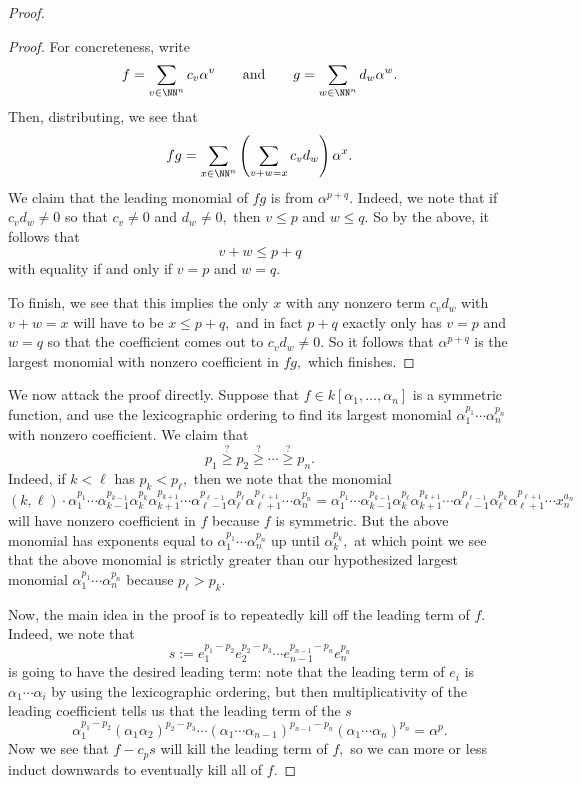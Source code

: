 \begin{proof}
\begin{proof}
		For concreteness, write
		\[f=\sum_{v\in \NN^n}c_v\alpha^v\qquad\text{and}\qquad g=\sum_{w\in\NN^n}d_w\alpha^w.\]
		Then, distributing, we see that
		\[fg=\sum_{x\in\NN^n}\left(\sum_{v+w=x}c_vd_w\right)\alpha^x.\]
		We claim that the leading monomial of $fg$ is from $\alpha^{p+q}.$ Indeed, we note that if $c_vd_w\ne0$ so that $c_v\ne0$ and $d_w\ne0,$ then $v\le p$ and $w\le q.$ So by the above, it follows that
		\[v+w\le p+q\]
		with equality if and only if $v=p$ and $w=q.$

		To finish, we see that this implies the only $x$ with any nonzero term $c_vd_w$ with $v+w=x$ will have to be $x\le p+q,$ and in fact $p+q$ exactly only has $v=p$ and $w=q$ so that the coefficient comes out to $c_vd_w\ne0.$ So it follows that $\alpha^{p+q}$ is the largest monomial with nonzero coefficient in $fg,$ which finishes.
	\end{proof}

	We now attack the proof directly. Suppose that $f\in k[\alpha_1,\ldots,\alpha_n]$ is a symmetric function, and use the lexicographic ordering to find its largest monomial $\alpha_1^{p_1}\cdots \alpha_n^{p_n}$ with nonzero coefficient. We claim that
	\[p_1\stackrel?\ge p_2\stackrel?\ge\cdots\stackrel?\ge p_n.\]
	Indeed, if $k<\ell$ has $p_k<p_\ell,$ then we note that the monomial
	\[(k,\ell)\cdot \alpha_1^{p_1}\cdots \alpha_{k-1}^{p_{k-1}}\alpha_k^{p_k}\alpha_{k+1}^{p_{k+1}}\cdots \alpha_{\ell-1}^{p_{\ell-1}}\alpha_\ell^{p_\ell}\alpha_{\ell+1}^{p_{\ell+1}} \cdots \alpha_n^{p_n}=\alpha_1^{p_1}\cdots \alpha_{k-1}^{p_{k-1}}\alpha_k^{p_\ell}\alpha_{k+1}^{p_{k+1}}\cdots \alpha_{\ell-1}^{p_{\ell-1}}\alpha_\ell^{p_k}\alpha_{\ell+1}^{p_{\ell+1}} \cdots x_n^{a_n}\]
	will have nonzero coefficient in $f$ because $f$ is symmetric. But the above monomial has exponents equal to $\alpha_1^{p_1}\cdots\alpha_n^{p_n}$ up until $\alpha_k^{p_k},$ at which point we see that the above monomial is strictly greater than our hypothesized largest monomial $\alpha_1^{p_1}\cdots \alpha_n^{p_n}$ because $p_\ell>p_k.$

	Now, the main idea in the proof is to repeatedly kill off the leading term of $f.$ Indeed, we note that
	\[s:=e_1^{p_1-p_2}e_2^{p_2-p_3}\cdots e_{n-1}^{p_{n-1}-p_n}e_n^{p_n}\]
	is going to have the desired leading term: note that the leading term of $e_i$ is $\alpha_1\cdots\alpha_i$ by using the lexicographic ordering, but then multiplicativity of the leading coefficient tells us that the leading term of the $s$
	\[\alpha_1^{p_1-p_2}(\alpha_1\alpha_2)^{p_2-p_3}\cdots(\alpha_1\cdots\alpha_{n-1})^{p_{n-1}-p_n}(\alpha_1\cdots\alpha_n)^{p_n}=\alpha^p.\]
	Now we see that $f-c_ps$ will kill the leading term of $f,$ so we can more or less induct downwards to eventually kill all of $f.$


\end{proof}
